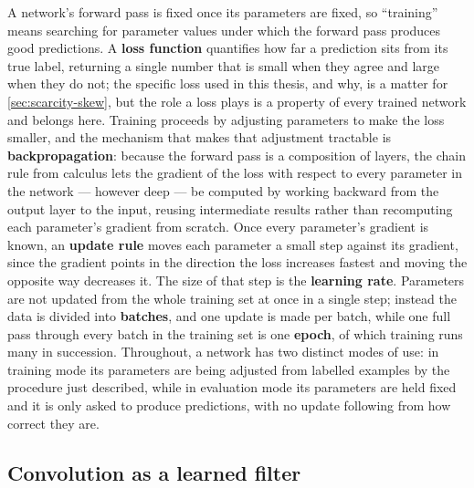 A network's forward pass is fixed once its parameters are fixed, so ``training'' means searching for parameter values under which the forward pass produces good predictions. A \textbf{loss function} quantifies how far a prediction sits from its true label, returning a single number that is small when they agree and large when they do not; the specific loss used in this thesis, and why, is a matter for \autoref{sec:scarcity-skew}, but the role a loss plays is a property of every trained network and belongs here. Training proceeds by adjusting parameters to make the loss smaller, and the mechanism that makes that adjustment tractable is \textbf{backpropagation}: because the forward pass is a composition of layers, the chain rule from calculus lets the gradient of the loss with respect to every parameter in the network --- however deep --- be computed by working backward from the output layer to the input, reusing intermediate results rather than recomputing each parameter's gradient from scratch. Once every parameter's gradient is known, an \textbf{update rule} moves each parameter a small step against its gradient, since the gradient points in the direction the loss increases fastest and moving the opposite way decreases it. The size of that step is the \textbf{learning rate}. Parameters are not updated from the whole training set at once in a single step; instead the data is divided into \textbf{batches}, and one update is made per batch, while one full pass through every batch in the training set is one \textbf{epoch}, of which training runs many in succession. Throughout, a network has two distinct modes of use: in training mode its parameters are being adjusted from labelled examples by the procedure just described, while in evaluation mode its parameters are held fixed and it is only asked to produce predictions, with no update following from how correct they are.

\subsection{Convolution as a learned filter}
\label{sec:convolution}

